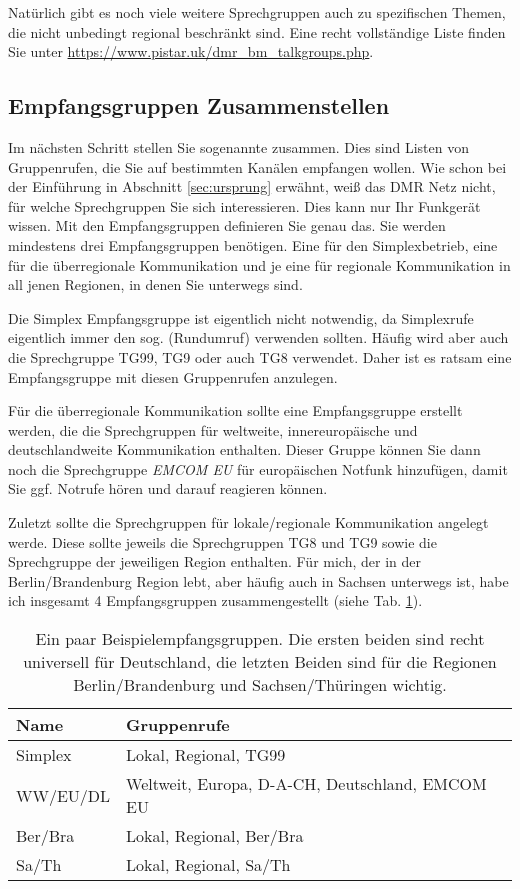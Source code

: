 Natürlich gibt es noch viele weitere Sprechgruppen auch zu spezifischen Themen, die nicht unbedingt regional beschränkt sind. Eine recht vollständige Liste finden Sie unter \url{https://www.pistar.uk/dmr_bm_talkgroups.php}.


\subsection{Empfangsgruppen Zusammenstellen} \label{sec:cp:grouplist}
Im nächsten Schritt stellen Sie sogenannte  zusammen. Dies sind Listen von Gruppenrufen, die Sie auf bestimmten Kanälen empfangen wollen. Wie schon bei der Einführung in Abschnitt \ref{sec:ursprung} erwähnt, weiß das DMR Netz nicht, für welche Sprechgruppen Sie sich interessieren. Dies kann nur Ihr Funkgerät wissen. Mit den Empfangsgruppen definieren Sie genau das. Sie werden mindestens drei Empfangsgruppen benötigen. Eine für den Simplexbetrieb, eine für die überregionale Kommunikation und je eine für regionale Kommunikation in all jenen Regionen, in denen Sie unterwegs sind.

Die Simplex Empfangsgruppe ist eigentlich nicht notwendig, da Simplexrufe eigentlich immer den sog.  (Rundumruf) verwenden sollten. Häufig wird aber auch die Sprechgruppe TG99, TG9 oder auch TG8 verwendet. Daher ist es ratsam eine Empfangsgruppe mit diesen Gruppenrufen anzulegen. 

Für die überregionale Kommunikation sollte eine Empfangsgruppe erstellt werden, die die Sprechgruppen für weltweite, innereuropäische und deutschlandweite Kommunikation enthalten. Dieser Gruppe können Sie dann noch die Sprechgruppe \emph{EMCOM EU} für europäischen Notfunk hinzufügen, damit Sie ggf. Notrufe hören und darauf reagieren können. 

Zuletzt sollte die Sprechgruppen für lokale/regionale Kommunikation angelegt werde. Diese sollte jeweils die Sprechgruppen TG8 und TG9 sowie die Sprechgruppe der jeweiligen Region enthalten. Für mich, der in der Berlin/Brandenburg Region lebt, aber häufig auch in Sachsen unterwegs ist, habe ich insgesamt 4 Empfangsgruppen zusammengestellt (siehe Tab. \ref{tab:grouplist}).
  
\begin{table}
 \centering
 \begin{tabular}{|l|l|} \hline
 Name     & Gruppenrufe \\ \hline
 Simplex  & Lokal, Regional, TG99 \\
 WW/EU/DL & Weltweit, Europa, D-A-CH, Deutschland, EMCOM EU \\
 Ber/Bra  & Lokal, Regional, Ber/Bra \\
 Sa/Th    & Lokal, Regional, Sa/Th \\ \hline
 \end{tabular}
 \caption{Ein paar Beispielempfangsgruppen. Die ersten beiden sind recht universell für Deutschland, die letzten Beiden sind für die Regionen Berlin/Brandenburg und Sachsen/Thüringen wichtig.} \label{tab:grouplist}
\end{table}


